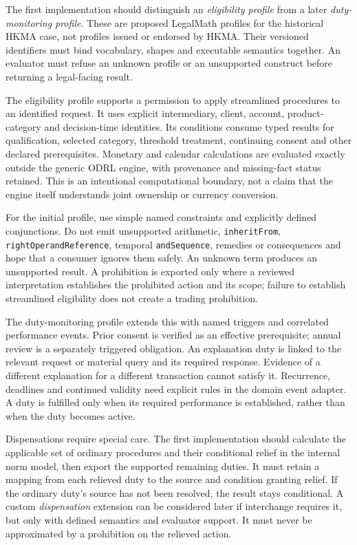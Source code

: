 The first implementation should distinguish an \emph{eligibility profile}
from a later \emph{duty-monitoring profile}. These are proposed LegalMath
profiles for the historical HKMA case, not profiles issued or endorsed by
HKMA. Their versioned identifiers must bind vocabulary, shapes and executable
semantics together. An evaluator must refuse an unknown profile or an
unsupported construct before returning a legal-facing result.

The eligibility profile supports a permission to apply streamlined procedures
to an identified request. It uses explicit intermediary, client, account,
product-category and decision-time identities. Its conditions consume typed
results for qualification, selected category, threshold treatment, continuing
consent and other declared prerequisites. Monetary and calendar calculations
are evaluated exactly outside the generic ODRL engine, with provenance and
missing-fact status retained. This is an intentional computational boundary,
not a claim that the engine itself understands joint ownership or currency
conversion.

For the initial profile, use simple named constraints and explicitly defined
conjunctions. Do not emit unsupported arithmetic, \texttt{inheritFrom},
\texttt{rightOperandReference}, temporal \texttt{andSequence}, remedies or
consequences and hope that a consumer ignores them safely. An unknown term
produces an unsupported result. A prohibition is exported only where a
reviewed interpretation establishes the prohibited action and its scope;
failure to establish streamlined eligibility does not create a trading
prohibition.

The duty-monitoring profile extends this with named triggers and correlated
performance events. Prior consent is verified as an effective prerequisite;
annual review is a separately triggered obligation. An explanation duty is
linked to the relevant request or material query and its required response.
Evidence of a different explanation for a different transaction cannot
satisfy it. Recurrence, deadlines and continued validity need explicit rules
in the domain event adapter. A duty is fulfilled only when its required
performance is established, rather than when the duty becomes active.

Dispensations require special care. The first implementation should calculate
the applicable set of ordinary procedures and their conditional relief in
the internal norm model, then export the supported remaining duties. It must
retain a mapping from each relieved duty to the source and condition granting
relief. If the ordinary duty's source has not been resolved, the result stays
conditional. A custom \emph{dispensation} extension can be considered later
if interchange requires it, but only with defined semantics and evaluator
support. It must never be approximated by a prohibition on the relieved action.

